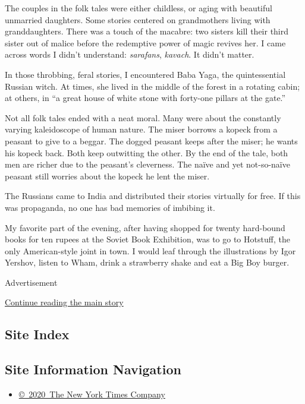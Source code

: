The couples in the folk tales were either childless, or aging with
beautiful unmarried daughters. Some stories centered on grandmothers
living with granddaughters. There was a touch of the macabre: two
sisters kill their third sister out of malice before the redemptive
power of magic revives her. I came across words I didn't understand:
\emph{sarafans}, \emph{kavach}. It didn't matter.

In those throbbing, feral stories, I encountered Baba Yaga, the
quintessential Russian witch. At times, she lived in the middle of the
forest in a rotating cabin; at others, in ``a great house of white stone
with forty-one pillars at the gate.''

Not all folk tales ended with a neat moral. Many were about the
constantly varying kaleidoscope of human nature. The miser borrows a
kopeck from a peasant to give to a beggar. The dogged peasant keeps
after the miser; he wants his kopeck back. Both keep outwitting the
other. By the end of the tale, both men are richer due to the peasant's
cleverness. The naïve and yet not-so-naïve peasant still worries about
the kopeck he lent the miser.

The Russians came to India and distributed their stories virtually for
free. If this was propaganda, no one has bad memories of imbibing it.

My favorite part of the evening, after having shopped for twenty
hard-bound books for ten rupees at the Soviet Book Exhibition, was to go
to Hotstuff, the only American-style joint in town. I would leaf through
the illustrations by Igor Yershov, listen to Wham, drink a strawberry
shake and eat a Big Boy burger.

Advertisement

\protect\hyperlink{after-bottom}{Continue reading the main story}

\hypertarget{site-index}{%
\subsection{Site Index}\label{site-index}}

\hypertarget{site-information-navigation}{%
\subsection{Site Information
Navigation}\label{site-information-navigation}}

\begin{itemize}
\tightlist
\item
  \href{https://help.nytimes.com/hc/en-us/articles/115014792127-Copyright-notice}{©~2020~The
  New York Times Company}
\end{itemize}

